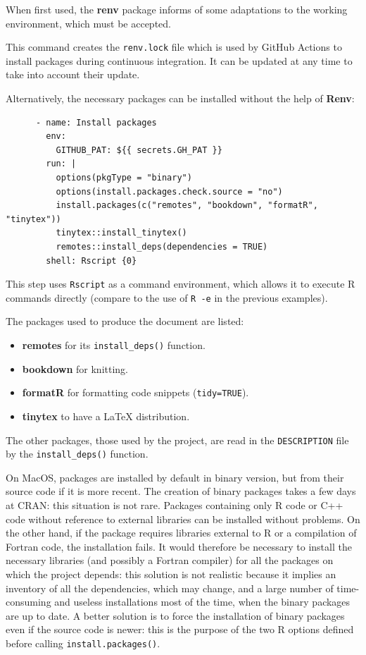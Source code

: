 \documentclass[
  12pt,
  american,
  a4paper,
  extrafontsizes,onecolumn,openright
  ]{memoir}
\providecommand{\tightlist}{%
  \setlength{\itemsep}{0pt}\setlength{\parskip}{0pt}}
\begin{document}
\normalsize

When first used, the \textbf{renv} package informs of some adaptations to the working environment, which must be accepted.

This command creates the \texttt{renv.lock} file which is used by GitHub Actions to install packages during continuous integration.
It can be updated at any time to take into account their update.

Alternatively, the necessary packages can be installed without the help of \textbf{Renv}:

\begin{verbatim}
      - name: Install packages
        env:
          GITHUB_PAT: ${{ secrets.GH_PAT }}
        run: |
          options(pkgType = "binary")
          options(install.packages.check.source = "no")
          install.packages(c("remotes", "bookdown", "formatR", "tinytex"))
          tinytex::install_tinytex()
          remotes::install_deps(dependencies = TRUE)
        shell: Rscript {0}
\end{verbatim}

This step uses \texttt{Rscript} as a command environment, which allows it to execute R commands directly (compare to the use of \texttt{R\ -e} in the previous examples).

The packages used to produce the document are listed:

\begin{itemize}
\tightlist
\item
  \textbf{remotes} for its \texttt{install\_deps()} function.
\item
  \textbf{bookdown} for knitting.
\item
  \textbf{formatR} for formatting code snippets (\texttt{tidy=TRUE}).
\item
  \textbf{tinytex} to have a LaTeX distribution.
\end{itemize}

The other packages, those used by the project, are read in the \texttt{DESCRIPTION} file by the \texttt{install\_deps()} function.

On MacOS, packages are installed by default in binary version, but from their source code if it is more recent.
The creation of binary packages takes a few days at CRAN: this situation is not rare.
Packages containing only R code or C++ code without reference to external libraries can be installed without problems.
On the other hand, if the package requires libraries external to R or a compilation of Fortran code, the installation fails.
It would therefore be necessary to install the necessary libraries (and possibly a Fortran compiler) for all the packages on which the project depends: this solution is not realistic because it implies an inventory of all the dependencies, which may change, and a large number of time-consuming and useless installations most of the time, when the binary packages are up to date.
A better solution is to force the installation of binary packages even if the source code is newer: this is the purpose of the two R options defined before calling \texttt{install.packages()}.
\end{document}
